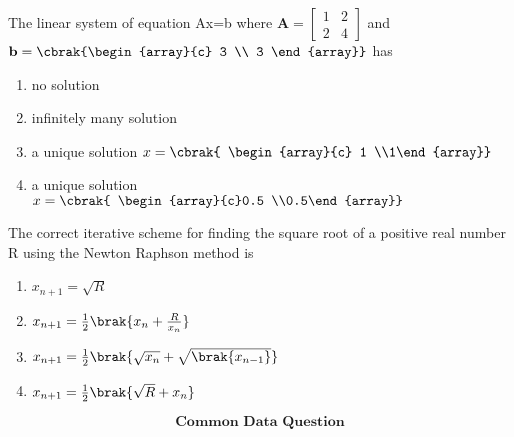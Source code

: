 \iffalse
\chapter{2009}
\author{AI24BTECH11032}
\section{ae}
\fi

\item The linear system of equation Ax=b where $\textbf{A}=\begin{bmatrix}
1 & 2 \\
2 & 4
\end{bmatrix}
$ and $\textbf{b}=\cbrak{\begin{array}{c}
3 \\
3
\end{array}}
$ has
\begin{multicols}{2}
    \begin{enumerate}
        \item no solution
        \item infinitely many solution
        \item a unique solution $x=\cbrak{ \begin{array}{c}
                 1 \\1\end{array}}$
        \item a unique solution $x = \cbrak{ \begin{array}{c}0.5 \\0.5\end{array}}$         
    \end{enumerate}
\end{multicols}
\bigskip
\item The correct iterative scheme for finding the square root of a positive real number R using the Newton Raphson method is
\begin{multicols}{2}
    \begin{enumerate}
        \item $x_{n+1}=\sqrt{R}$
        \item $x_{n+1}=\frac{1}{2}\brak{x_{n}+\frac{R}{x_{n}}}$
        \item $x_{n+1}=\frac{1}{2}\brak{\sqrt{x_{n}}+\sqrt{\brak{x_{n-1}}}}$
        \item $x_{n+1}=\frac{1}{2}\brak{\sqrt{R}+x_{n}}$        
    \end{enumerate}
\end{multicols}
\bigskip
$$\textbf{Common Data Question}$$
